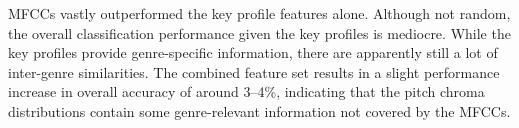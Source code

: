 \documentclass{article}
\begin{document}



MFCCs vastly outperformed the key profile features alone. Although not random, the overall classification performance given the key profiles is mediocre. While the key profiles provide genre-specific information, there are apparently still a lot of inter-genre similarities. The combined feature set results in a slight performance increase in overall accuracy of around 3--4\%, indicating that the pitch chroma distributions contain some genre-relevant information not covered by the MFCCs. 
\end{document}
